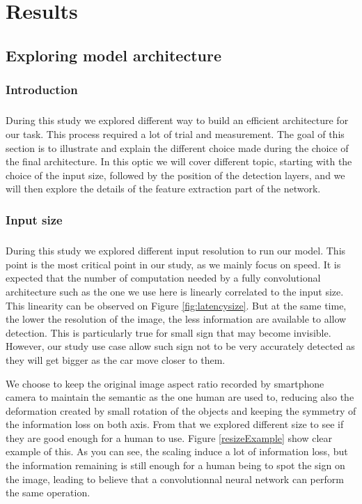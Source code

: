 \chapter{Results} \label{chapter:resutls}

\section{Exploring model architecture}
\subsection{Introduction}
\paragraph{}
During this study we explored different way to build an efficient architecture for our task. This process required a lot of trial and measurement. The goal of this section is to illustrate and explain the different choice made during the choice of the final architecture. In this optic we will cover different topic, starting with the choice of the input size, followed by the position of the detection layers, and we will then explore the details of the feature extraction part of the network.

\subsection{Input size} \label{sec:inputSize}
\paragraph{}
During this study we explored different input resolution to run our model. This point is the most critical point in our study, as we mainly focus on speed. It is expected that the number of computation needed by a fully convolutional architecture such as the one we use here is linearly correlated to the input size. This linearity can be observed on Figure \ref{fig:latencysize}. But at the same time, the lower the resolution of the image, the less information are available to allow detection. This is particularly true for small sign that may become invisible. However, our study use case allow such sign not to be very accurately detected as they will get bigger as the car move closer to them.

We choose to keep the original image aspect ratio recorded by smartphone camera to maintain the semantic as the one human are used to, reducing also the deformation created by small rotation of the objects and keeping the symmetry of the information loss on both axis. From that we explored different size to see if they are good enough for a human to use. Figure \ref{resizeExample} show clear example of this. As you can see, the scaling induce a lot of information loss, but the information remaining is still enough for a human being to spot the sign on the image, leading to believe that a convolutionnal neural network can perform the same operation.

